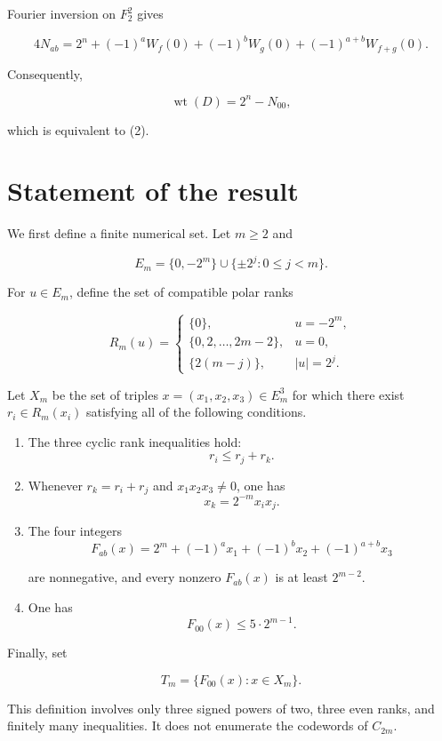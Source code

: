 \documentclass[11pt]{article}
\theoremstyle{remark}
\begin{document}
Fourier inversion on $F_2^2$ gives

\[
4N_{ab}
=2^n+(-1)^aW_f(0)+(-1)^bW_g(0)
+(-1)^{a+b}W_{f+g}(0).
\tag{9}
\]

Consequently,

\[
\operatorname{wt}(D)=2^n-N_{00},
\tag{10}
\]

which is equivalent to (2).

\section{Statement of the result}

We first define a finite numerical set. Let $m\ge 2$ and

\[
E_m=\{0,-2^m\}\cup\{\pm2^j:0\le j<m\}.
\tag{11}
\]

For $u \in E_m$, define the set of compatible polar ranks

\[
R_m(u)=
\begin{cases}
\{0\},&u=-2^m,\\
\{0,2,\ldots,2m-2\},&u=0,\\
\{2(m-j)\},&|u|=2^j.
\end{cases}
\tag{12}
\]

Let $X_m$ be the set of triples $x=(x_1,x_2,x_3) \in E_m^3$ for which there exist $r_i \in R_m(x_i)$ satisfying all of the following conditions.

\begin{enumerate}
\item The three cyclic rank inequalities hold:
\[
   r_i\le r_j+r_k.
   \tag{13}
\]

\item Whenever $r_k=r_i+r_j$ and $x_1x_2x_3 \ne  0$, one has
\[
   x_k=2^{-m}x_ix_j.
   \tag{14}
\]

\item The four integers
\[
   F_{ab}(x)
   =2^m+(-1)^ax_1+(-1)^bx_2+(-1)^{a+b}x_3
   \tag{15}
\]

   are nonnegative, and every nonzero $F_{ab}(x)$ is at least $2^{m-2}$.

\item One has
\[
   F_{00}(x)\le5\cdot2^{m-1}.
   \tag{16}
\]
\end{enumerate}

Finally, set

\[
T_m=\{F_{00}(x):x\in X_m\}.
\tag{17}
\]

This definition involves only three signed powers of two, three even ranks, and finitely many inequalities. It does not enumerate the codewords of $C_{2m}$.
\end{document}
